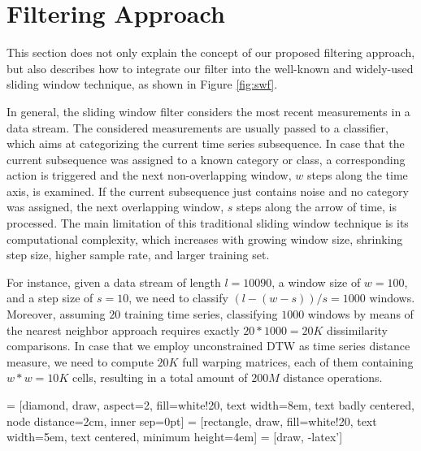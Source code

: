 \section{Filtering Approach} \label{filtering_approach}

This section does not only explain the concept of our proposed filtering approach, but also describes how to integrate our filter into the well-known and widely-used sliding window technique, as shown in Figure \ref{fig:swf}.

In general, the sliding window filter considers the most recent measurements in a data stream. The considered measurements are usually passed to a classifier, which aims at categorizing the current time series subsequence. In case that the current subsequence was assigned to a known category or class, a corresponding action is triggered and the next non-overlapping window, $w$ steps along the time axis, is examined. If the current subsequence just contains noise and no category was assigned, the next overlapping window, $s$ steps along the arrow of time, is processed. The main limitation of this traditional sliding window technique is its computational complexity, which increases with growing window size, shrinking step size, higher sample rate, and larger training set. %

For instance, given a data stream of length $l {=} 10090$, a window size of $w {=} 100$, and a step size of $s {=} 10$, we need to classify $(l - (w - s)) / s = 1000$ windows. Moreover, assuming $20$ training time series, classifying $1000$ windows by means of the nearest neighbor approach requires exactly $20*1000=20K$ dissimilarity comparisons. In case that we employ unconstrained DTW as time series distance measure, we need to compute $20K$ full warping matrices, each of them containing $w*w = 10K$ cells, resulting in a total amount of $200M$ distance operations.


 = [diamond, draw, aspect=2, fill=white!20, text width=8em, text badly centered, node distance=2cm, inner sep=0pt]
 = [rectangle, draw, fill=white!20, text width=5em, text centered, minimum height=4em]
 = [draw, -latex']

